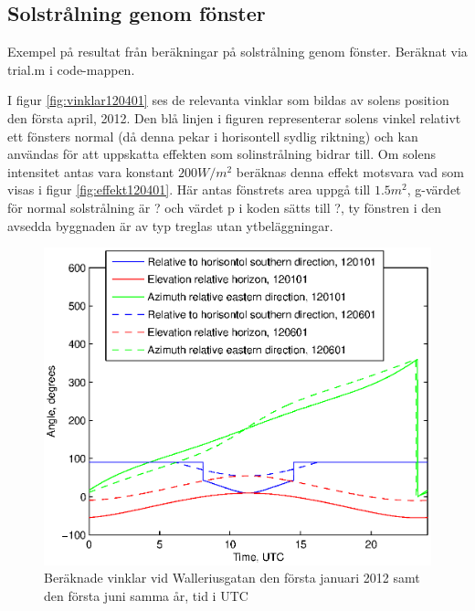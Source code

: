 \subsection{Solstrålning genom fönster}

Exempel på resultat från beräkningar på solstrålning genom fönster. Beräknat via trial.m i code-mappen.

I figur \ref{fig:vinklar120401} ses de relevanta vinklar som bildas av solens position den första april, 2012. Den blå linjen i figuren representerar solens vinkel relativt ett fönsters normal (då denna pekar i horisontell sydlig riktning) och kan användas för att uppskatta effekten som solinstrålning bidrar till. Om solens intensitet antas vara konstant $\unit{200}{W/m^2}$ beräknas denna effekt motsvara vad som visas i figur \ref{fig:effekt120401}. Här antas fönstrets area uppgå till $\unit{1.5}{m^2}$, g-värdet för normal solstrålning är ? och värdet p i koden sätts till ?, ty fönstren i den avsedda byggnaden är av typ treglas utan ytbeläggningar.

\begin{figure}[hpbt]
\centering
\includegraphics[scale=1]{images/sun0101and0601.eps}
\caption{\label{fig:sun0101and0601} Beräknade vinklar vid Walleriusgatan den första januari 2012 samt den första juni samma år, tid i UTC}
\end{figure}

